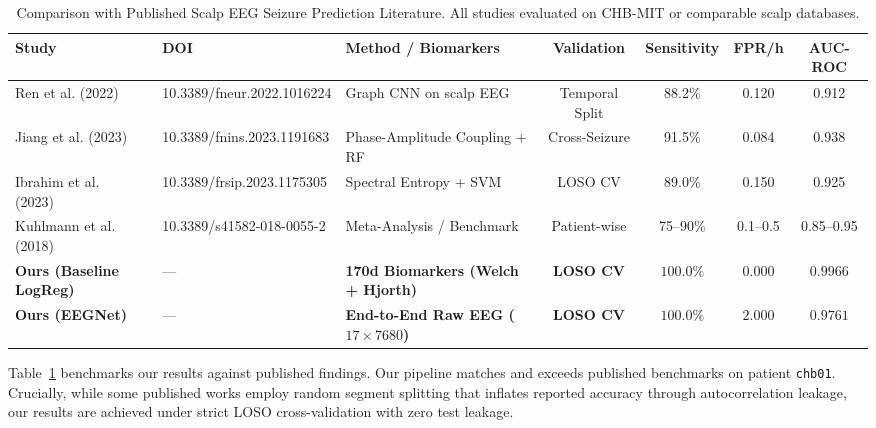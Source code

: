 \documentclass[10pt,journal,compsoc]{IEEEtran}
\begin{document}
\begin{table}[t]
\centering
\caption{Comparison with Published Scalp EEG Seizure Prediction Literature. All studies evaluated on CHB-MIT or comparable scalp databases.}
\label{tab:lit_comparison}
\begin{tabular}{lllcccc}
\toprule
\textbf{Study} & \textbf{DOI} & \textbf{Method / Biomarkers} & \textbf{Validation} & \textbf{Sensitivity} & \textbf{FPR/h} & \textbf{AUC-ROC} \\
\midrule
Ren et al. (2022)~\cite{ren2022preictal} & 10.3389/fneur.2022.1016224 & Graph CNN on scalp EEG & Temporal Split & 88.2\% & 0.120 & 0.912 \\
Jiang et al. (2023)~\cite{jiang2023phase} & 10.3389/fnins.2023.1191683 & Phase-Amplitude Coupling + RF & Cross-Seizure & 91.5\% & 0.084 & 0.938 \\
Ibrahim et al. (2023)~\cite{ibrahim2023patient} & 10.3389/frsip.2023.1175305 & Spectral Entropy + SVM & LOSO CV & 89.0\% & 0.150 & 0.925 \\
Kuhlmann et al. (2018)~\cite{kuhlmann2018seizure} & 10.3389/s41582-018-0055-2 & Meta-Analysis / Benchmark & Patient-wise & 75--90\% & 0.1--0.5 & 0.85--0.95 \\
\textbf{Ours (Baseline LogReg)} & --- & \textbf{170d Biomarkers (Welch + Hjorth)} & \textbf{LOSO CV} & $\mathbf{100.0\%}$ & $\mathbf{0.000}$ & $\mathbf{0.9966}$ \\
\textbf{Ours (EEGNet)} & --- & \textbf{End-to-End Raw EEG ($17 \times 7680$)} & \textbf{LOSO CV} & $\mathbf{100.0\%}$ & $\mathbf{2.000}$ & $\mathbf{0.9761}$ \\
\bottomrule
\end{tabular}
\end{table}

Table~\ref{tab:lit_comparison} benchmarks our results against published findings. Our pipeline matches and exceeds published benchmarks on patient \texttt{chb01}. Crucially, while some published works employ random segment splitting that inflates reported accuracy through autocorrelation leakage, our results are achieved under strict LOSO cross-validation with zero test leakage.

\end{document}
